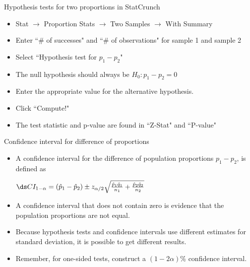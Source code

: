\documentclass[xcolor=table, handout]{beamer}
\begin{document}
\begin{frame}{Hypothesis tests for two proportions in StatCrunch}

\begin{block}{}
\begin{itemize}
\large
\item Stat $\to$ Proportion Stats $\to$ Two Samples $\to$ With Summary
\item Enter ``\# of successes" and ``\# of observations" for sample 1 and sample 2
\item Select ``Hypothesis test for $p_1 - p_2$"
\item The null hypothesis should always be $H_0: p_1 - p_2 = 0$
\item Enter the appropriate value for the alternative hypothesis.
\item Click ``Compute!"
\item The test statistic and p-value are found in ``Z-Stat" and ``P-value"
\end{itemize}
\end{block}

\end{frame}

\begin{frame}{Confidence interval for difference of proportions}
\begin{block}{}
\large
\begin{itemize}
\item A confidence interval for the difference of population proportions $p_1 - p_2$, is defined as\\
\smallskip
{\centering $\ds CI_{1-\alpha} = (\hat p_1 - \hat p_2) \pm z_{\alpha/2} \sqrt{\frac {\hat p_1 \hat q_1}{n_1} + \frac {\hat p_2 \hat q_2}{n_2}}$ \par}
\smallskip
\pause\item A confidence interval that does not contain zero is evidence that the population proportions are not equal.

\pause\item Because hypothesis tests and confidence intervals use different estimates for standard deviation, it is possible to get different results.

\pause\item Remember, for one-sided tests, construct a $(1-2\alpha)$\% confidence interval.
\end{itemize}
\end{block}
\end{frame}
\end{document}
